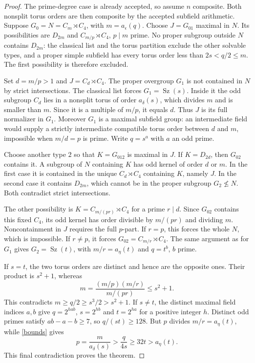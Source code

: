 \documentclass[11pt,a4paper]{article}
\newcommand{\Sz}{\operatorname{Sz}}
\begin{document}
\begin{proof}
The prime-degree case is already accepted, so assume $n$ composite.
Both nonsplit torus orders are then composite by the accepted subfield
arithmetic. Suppose $G_0=N=C_m\rtimes C_4$, with $m=a_\epsilon(q)$.
Choose $J=G_{01}$ maximal in $N$. Its possibilities are
$D_{2m}$ and $C_{m/p}\rtimes C_4$, $p\mid m$ prime.
No proper subgroup outside $N$ contains $D_{2m}$: the classical list
and the torus partition exclude the other solvable types, and a proper
simple subfield has every torus order less than $2s<q/2\le m$.
The first possibility is therefore excluded.

Set $d=m/p>1$ and $J=C_d\rtimes C_4$. The proper overgroup $G_1$
is not contained in $N$ by strict intersections. The classical list
forces $G_1=\Sz(s)$. Inside it the odd subgroup $C_d$ lies in a
nonsplit torus of order $a_\delta(s)$, which divides $m$ and is
smaller than $m$. Since it is a multiple of $m/p$, it equals $d$.
Thus $J$ is its full normalizer in $G_1$. Moreover $G_1$ is a maximal
subfield group: an intermediate field would supply a strictly intermediate
compatible torus order between $d$ and $m$, impossible when $m/d=p$
is prime. Write $q=s^a$ with $a$ an odd prime.

Choose another type $2$ so that $K=G_{012}$ is maximal in $J$.
If $K=D_{2d}$, then $G_{02}$ contains it. A subgroup of $N$ containing
$K$ has odd kernel of order $d$ or $m$. In the first case it is contained
in the unique $C_d\rtimes C_4$ containing $K$, namely $J$.
In the second case it contains $D_{2m}$, which cannot be in the proper
subgroup $G_2\nleq N$. Both contradict strict intersections.

The other possibility is $K=C_{m/(pr)}\rtimes C_4$ for a prime
$r\mid d$. Since $G_{02}$ contains this fixed $C_4$, its odd kernel
has order divisible by $m/(pr)$ and dividing $m$. Noncontainment in
$J$ requires the full $p$-part. If $r=p$, this forces the whole $N$,
which is impossible. If $r\ne p$, it forces
$G_{02}=C_{m/r}\rtimes C_4$. The same argument as for $G_1$ gives
$G_2=\Sz(t)$, with $m/r=a_\eta(t)$ and $q=t^b$, $b$ prime.

If $s=t$, the two torus orders are distinct and hence are the opposite
ones. Their product is $s^2+1$, whereas
\[
 m=\frac{(m/p)(m/r)}{m/(pr)}\le s^2+1.
\]
This contradicts $m\ge q/2\ge s^3/2>s^2+1$.
If $s\ne t$, the distinct maximal field indices $a,b$ give
$q=2^{hab}$, $s=2^{hb}$ and $t=2^{ha}$ for a positive integer $h$.
Distinct odd primes satisfy $ab-a-b\ge7$, so $q/(st)\ge128$.
But $p$ divides $m/r=a_\eta(t)$, while \eqref{bounds} gives
\[
 p=\frac{m}{a_\delta(s)}>\frac{q}{4s}\ge32t>a_\eta(t).
\]
This final contradiction proves the theorem.
\end{proof}
\end{document}
